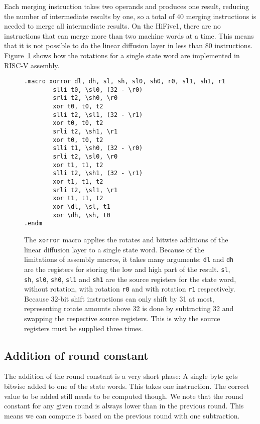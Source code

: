 Each merging instruction takes two operands and produces one result, reducing
the number of intermediate results by one, so a total of 40 merging instructions
is needed to merge all intermediate results. On the HiFive1, there are no
instructions that can merge more than two machine words at a time. This means
that it is not possible to do the linear diffusion layer in less than 80
instructions. Figure~\ref{xorror} shows how the rotations for a single state
word are implemented in RISC-V assembly.

\begin{figure}[p]
\begin{verbatim}
.macro xorror dl, dh, sl, sh, sl0, sh0, r0, sl1, sh1, r1
        slli t0, \sl0, (32 - \r0)
        srli t2, \sh0, \r0
        xor t0, t0, t2
        slli t2, \sl1, (32 - \r1)
        xor t0, t0, t2
        srli t2, \sh1, \r1
        xor t0, t0, t2
        slli t1, \sh0, (32 - \r0)
        srli t2, \sl0, \r0
        xor t1, t1, t2
        slli t2, \sh1, (32 - \r1)
        xor t1, t1, t2
        srli t2, \sl1, \r1
        xor t1, t1, t2
        xor \dl, \sl, t1
        xor \dh, \sh, t0
.endm
\end{verbatim}

\caption{The \texttt{xorror} macro applies the rotates and bitwise additions of
the linear diffusion layer to a single state word. Because of the limitations of
assembly macros, it takes many arguments:
\texttt{dl} and \texttt{dh} are the registers for storing the low and high part
of the result. \texttt{sl}, \texttt{sh}, \texttt{sl0}, \texttt{sh0},
\texttt{sl1} and \texttt{sh1} are the source registers for the state word,
without rotation, with rotation \texttt{r0} and with rotation \texttt{r1}
respectively. Because 32-bit shift instructions can only shift by 31 at most,
representing rotate amounts above 32 is done by subtracting 32 and swapping the
respective source registers. This is why the source registers must be supplied
three times.}

\label{xorror}
\end{figure}

\subsection{Addition of round constant}

The addition of the round constant is a very short phase: A single byte gets
bitwise added to one of the state words. This takes one instruction. The correct
value to be added still needs to be computed though. We note that the round
constant for any given round is always  lower than in the previous round.
This means we can compute it based on the previous round with one subtraction.


